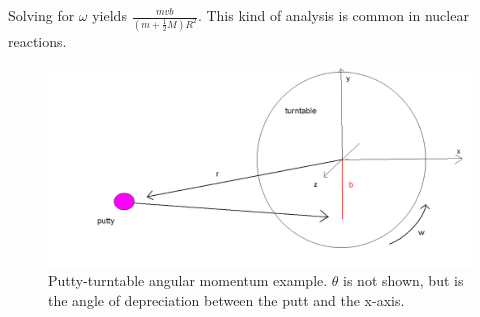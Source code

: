 Solving for $\omega$ yields $\frac{mvb}{(m+\frac{1}{2}M)R^2}$. This kind of analysis is common in nuclear reactions.

\begin{figure}[h]
    \centering
    \includegraphics[width=13cm]{Classical_Mechanics/2.6-angular-momentum/ex-putty-turntable.png}
    \caption{Putty-turntable angular momentum example. $\theta$ is not shown, but is the angle of depreciation between the putt and the x-axis.}
    \label{fig:putty-turntable}
\end{figure}

{\exend}